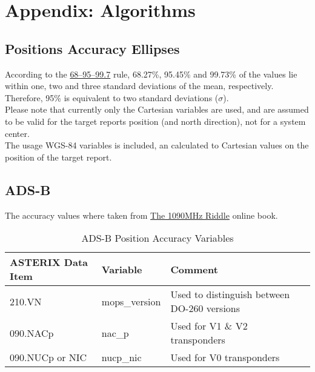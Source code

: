 \section{Appendix: Algorithms}
\label{sec:appendix_algorithms}  

\subsection{Positions Accuracy Ellipses}
\label{sec:algo_position_accuracy_ellipses} 

According to the \href{https://en.wikipedia.org/wiki/68%E2%80%9395%E2%80%9399.7_rule}{68–95–99.7} rule, 68.27\%, 95.45\% and 99.73\% of the values lie within one, two and three standard deviations of the mean, respectively. \\

Therefore, 95\% is equivalent to two standard deviations ($\sigma$). \\

Please note that currently only the Cartesian variables are used, and are assumed to be valid for the target reports position (and north direction), not for a system center. \\

The usage WGS-84 variables is included, an calculated to Cartesian values on the position of the target report.

\subsection{ADS-B}

The accuracy values where taken from \href{https://mode-s.org/decode/adsb/uncertainty.html}{The 1090MHz Riddle} online book.

\begin{center}
 \begin{table}[H]
  \begin{tabularx}{\textwidth}{ | X | l | l | }
    \hline
    \textbf{ASTERIX Data Item} & \textbf{Variable} & \textbf{Comment} \\ \hline
    210.VN & mops\_version & Used to distinguish between DO-260 versions \\ \hline
    090.NACp & nac\_p  & Used for V1 \& V2 transponders \\ \hline
    090.NUCp or NIC & nucp\_nic  & Used for V0 transponders \\ \hline
  \end{tabularx}
  \caption{ADS-B Position Accuracy Variables}
\end{table}
\end{center}

